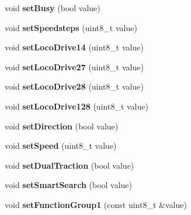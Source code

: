\begin{DoxyCompactItemize}
void {\bfseries set\+Busy} (bool value)
\item 
\mbox{\label{classTBT_1_1LocDecoder_aa919a313cb33a49d792694a544f2d3de}} 
void {\bfseries set\+Speedsteps} (uint8\+\_\+t value)
\item 
\mbox{\label{classTBT_1_1LocDecoder_a5b0ba8089edaf920fb513e26701580bf}} 
void {\bfseries set\+Loco\+Drive14} (uint8\+\_\+t value)
\item 
\mbox{\label{classTBT_1_1LocDecoder_ace59dd8679514643328ce916057669e4}} 
void {\bfseries set\+Loco\+Drive27} (uint8\+\_\+t value)
\item 
\mbox{\label{classTBT_1_1LocDecoder_a6bbf6c173217c49b7d4909b9c4cb5127}} 
void {\bfseries set\+Loco\+Drive28} (uint8\+\_\+t value)
\item 
\mbox{\label{classTBT_1_1LocDecoder_a9de246d419829f424e8b50c817c599ca}} 
void {\bfseries set\+Loco\+Drive128} (uint8\+\_\+t value)
\item 
\mbox{\label{classTBT_1_1LocDecoder_a7e5a054cecfa15cc2574b166c2001deb}} 
void {\bfseries set\+Direction} (bool value)
\item 
\mbox{\label{classTBT_1_1LocDecoder_afa7b68a8e717065e39c80a83cbd9bb66}} 
void {\bfseries set\+Speed} (uint8\+\_\+t value)
\item 
\mbox{\label{classTBT_1_1LocDecoder_a1dbc0fcca21619d0283e1a61bbb1f7b2}} 
void {\bfseries set\+Dual\+Traction} (bool value)
\item 
\mbox{\label{classTBT_1_1LocDecoder_ab17b176f9fb53af19911611dc35c4e76}} 
void {\bfseries set\+Smart\+Search} (bool value)
\item 
\mbox{\label{classTBT_1_1LocDecoder_a7d77fa29a27f1abff7dba21c3cca7ff1}} 
void {\bfseries set\+Function\+Group1} (const uint8\+\_\+t \&value)
\item 
\mbox{\label{classTBT_1_1LocDecoder_a71807a8bab2731cc511659f118ecb01a}} 

\end{DoxyCompactItemize}
